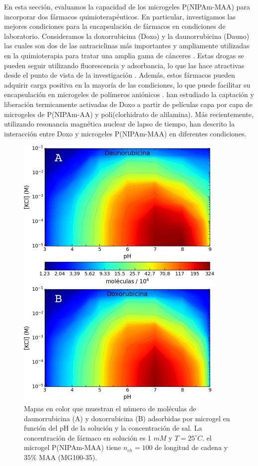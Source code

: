 En esta secci\'on, evaluamos la capacidad de los microgeles P(NIPAm-MAA) para incorporar dos f\'armacos quimioterap\'euticos. En particular, investigamos las mejores condiciones para la encapsulaci\'on de f\'armacos en condiciones de laboratorio. Consideramos la doxorrubicina (Doxo) y la daunorrubicina (Dauno) las cuales son dos de las antraciclinas m\'as importantes y ampliamente utilizadas en la quimioterapia para tratar una amplia gama de c\'anceres \cite{Panis2012, carvalho2009, aubel1984daunorubicin,come1999dual}. Estas drogas se pueden seguir utilizando fluorescencia y adsorbancia, lo que las hace atractivas desde el punto de vista de la investigaci\'on \cite{Serpe2005, ThanHtun2009, PerezChavez2020}. Adem\'as, estos f\'armacos pueden adquirir carga positiva en la mayor\'ia de las condiciones, lo que puede facilitar su encapsulaci\'on en microgeles de pol\'imeros ani\'onicos \cite{li2019}. \citet{Serpe2005} han estudiado la captaci\'on y liberaci\'on termicamente activadas de Doxo a partir de pel\'iculas capa por capa de microgeles de P(NIPAm-AA) y poli(clorhidrato de alilamina). M\'as recientemente, utilizando resonancia magn\'etica nuclear de lapso de tiempo, \citet{MartinezMoro2020} han descrito la interacci\'on entre Doxo y microgeles P(NIPAm-MAA) en diferentes condiciones.
\begin{figure}[!tb]
	\centering
	\includegraphics[width=0.55\linewidth]{Figures/graph-gel/drug_ads.pdf}
	\caption{Mapas en color que muestran el n\'umero de mol\'eculas de daunorrubicina (A) y doxorrubicina (B) adsorbidas por microgel en funci\'on del pH de la soluci\'on y la concentraci\'on de sal.
		La concentraci\'on de f\'armaco en soluci\'on es 1 $mM$ y $T=25 ^\circ C$.
		el microgel P(NIPAm-MAA) tiene $n_{ch}=100$ de longitud de cadena y $35\%$ MAA (MG100-35).}
	\label{fig:gel:drug_ads}
\end{figure}


